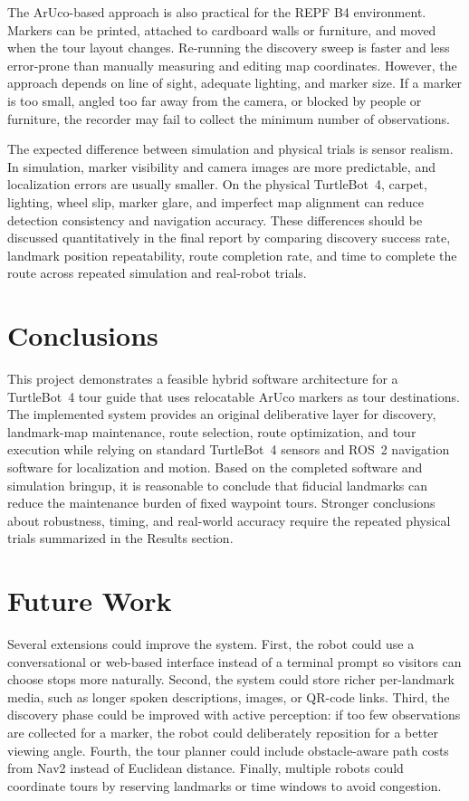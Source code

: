 \documentclass[12pt]{article}
\begin{document}
The ArUco-based approach is also practical for the REPF B4 environment. Markers can be printed, attached to cardboard walls or furniture, and moved when the tour layout changes. Re-running the discovery sweep is faster and less error-prone than manually measuring and editing map coordinates. However, the approach depends on line of sight, adequate lighting, and marker size. If a marker is too small, angled too far away from the camera, or blocked by people or furniture, the recorder may fail to collect the minimum number of observations.

The expected difference between simulation and physical trials is sensor realism. In simulation, marker visibility and camera images are more predictable, and localization errors are usually smaller. On the physical TurtleBot~4, carpet, lighting, wheel slip, marker glare, and imperfect map alignment can reduce detection consistency and navigation accuracy. These differences should be discussed quantitatively in the final report by comparing discovery success rate, landmark position repeatability, route completion rate, and time to complete the route across repeated simulation and real-robot trials.

\section*{Conclusions}
This project demonstrates a feasible hybrid software architecture for a TurtleBot~4 tour guide that uses relocatable ArUco markers as tour destinations. The implemented system provides an original deliberative layer for discovery, landmark-map maintenance, route selection, route optimization, and tour execution while relying on standard TurtleBot~4 sensors and ROS~2 navigation software for localization and motion. Based on the completed software and simulation bringup, it is reasonable to conclude that fiducial landmarks can reduce the maintenance burden of fixed waypoint tours. Stronger conclusions about robustness, timing, and real-world accuracy require the repeated physical trials summarized in the Results section.

\section*{Future Work}
Several extensions could improve the system. First, the robot could use a conversational or web-based interface instead of a terminal prompt so visitors can choose stops more naturally. Second, the system could store richer per-landmark media, such as longer spoken descriptions, images, or QR-code links. Third, the discovery phase could be improved with active perception: if too few observations are collected for a marker, the robot could deliberately reposition for a better viewing angle. Fourth, the tour planner could include obstacle-aware path costs from Nav2 instead of Euclidean distance. Finally, multiple robots could coordinate tours by reserving landmarks or time windows to avoid congestion.
\end{document}
